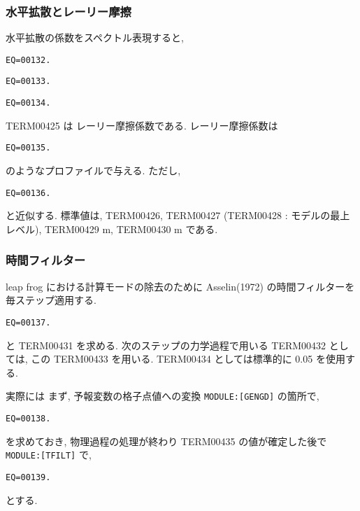 \subsubsection{水平拡散とレーリー摩擦}

水平拡散の係数をスペクトル表現すると,

\begin{verbatim}
EQ=00132.
\end{verbatim}
%
\begin{verbatim}
EQ=00133.
\end{verbatim}
%
\begin{verbatim}
EQ=00134.
\end{verbatim}

TERM00425 は レーリー摩擦係数である.
レーリー摩擦係数は
\begin{verbatim}
EQ=00135.
\end{verbatim}
のようなプロファイルで与える.
ただし,
\begin{verbatim}
EQ=00136.
\end{verbatim}
と近似する.
標準値は, TERM00426,
TERM00427 (TERM00428 : モデルの最上レベル),
TERM00429 m,
TERM00430 m である.

\subsubsection{時間フィルター}


leap frog における計算モードの除去のために 
Asselin(1972) の時間フィルターを毎ステップ適用する.
%
\begin{verbatim}
EQ=00137.
\end{verbatim}
%
と TERM00431 を求める.
次のステップの力学過程で用いる TERM00432 としては,
この TERM00433 を用いる.
TERM00434 としては標準的に 0.05 を使用する. 

実際には
まず, 予報変数の格子点値への変換 \texttt{MODULE:[GENGD]} の箇所で,
\begin{verbatim}
EQ=00138.
\end{verbatim}
を求めておき, 物理過程の処理が終わり
TERM00435 の値が確定した後で \texttt{MODULE:[TFILT]} で,
\begin{verbatim}
EQ=00139.
\end{verbatim}
とする.
